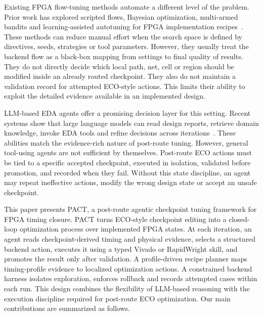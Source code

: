 \documentclass[conference]{IEEEtran}
\begin{document}
Existing FPGA flow-tuning methods automate a different level of the
problem. Prior work has explored scripted flows, Bayesian optimization,
multi-armed bandits and learning-assisted autotuning for FPGA
implementation recipes~\cite{amd_ug894_2025,amd_ug938_2025,
kapre_intime_2015,xu_datuner_2017,ustun_lamda_2019}. These methods can
reduce manual effort when the search space is defined by directives,
seeds, strategies or tool parameters. However, they usually treat the
backend flow as a black-box mapping from settings to final quality of
results. They do not directly decide which local path, net, cell or
region should be modified inside an already routed checkpoint. They
also do not maintain a validation record for attempted ECO-style
actions. This limits their ability to exploit the detailed evidence
available in an implemented design.

LLM-based EDA agents offer a promising decision layer for this setting.
Recent systems show that large language models can read design reports,
retrieve domain knowledge, invoke EDA tools and refine decisions across
iterations~\cite{pan_survey_llm_eda_2025,liu_chipnemo_2023,
ghose_orfs_agent_2025,ouyang_retrieve_schedule_reflect_2026,
nainani_timing_analysis_agent_2025}. These abilities match the
evidence-rich nature of post-route tuning. However, general tool-using
agents are not sufficient by themselves. Post-route ECO actions must be
tied to a specific accepted checkpoint, executed in isolation,
validated before promotion, and recorded when they fail. Without this
state discipline, an agent may repeat ineffective actions, modify the
wrong design state or accept an unsafe checkpoint.

This paper presents PACT, a post-route agentic checkpoint tuning
framework for FPGA timing closure. PACT turns ECO-style checkpoint
editing into a closed-loop optimization process over implemented FPGA
states. At each iteration, an agent reads checkpoint-derived timing and
physical evidence, selects a structured backend action, executes it
using a typed Vivado or RapidWright skill, and promotes the result
only after validation. A profile-driven recipe planner maps timing-profile evidence
to localized optimization actions. A constrained backend
harness isolates exploration, enforces rollback and records attempted
cases within each run. This design combines the flexibility of
LLM-based reasoning with the execution discipline required for
post-route ECO optimization.
Our main contributions are summarized as follows.
\end{document}
